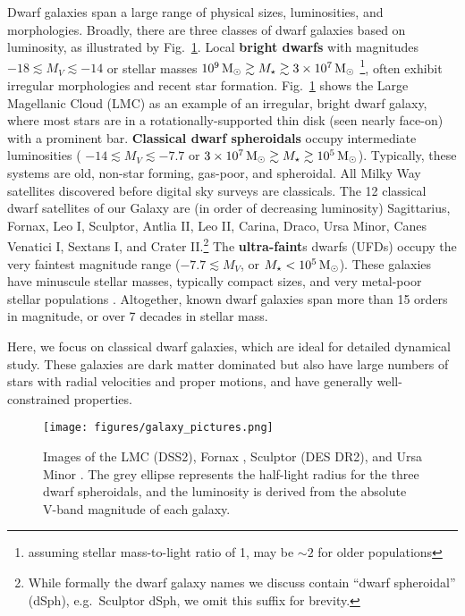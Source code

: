 Dwarf galaxies span a large range of physical sizes, luminosities, and
morphologies. Broadly, there are three classes of dwarf galaxies based
on luminosity, as illustrated by Fig.~\ref{fig:galaxy_images}. Local
\textbf{bright dwarfs} with magnitudes
\(-18 \lesssim M_V \lesssim  -14\) or stellar masses
\(10^9\,{\rm M}_{\odot} \gtrsim M_\star \gtrsim 3\times10^7\,{\rm M}_{\odot}\) \footnote{assuming
  stellar mass-to-light ratio of 1, may be \(\sim 2\) for older
  populations}, often exhibit irregular morphologies and recent star
formation. Fig.~\ref{fig:galaxy_images} shows the Large Magellanic Cloud
(LMC) as an example of an irregular, bright dwarf galaxy, where most
stars are in a rotationally-supported thin disk (seen nearly face-on)
with a prominent bar. \textbf{Classical dwarf spheroidals} occupy
intermediate luminosities ( \(-14 \lesssim M_V  \lesssim -7.7\) or
\(3\times10^7\,{\rm M}_{\odot} \gtrsim M_\star \gtrsim 10^5\,{\rm M}_{\odot}\)). Typically,
these systems are old, non-star forming, gas-poor, and spheroidal. All
Milky Way satellites discovered before digital sky surveys are
classicals. The 12 classical dwarf satellites of our Galaxy are (in
order of decreasing luminosity) Sagittarius, Fornax, Leo I, Sculptor,
Antlia II, Leo II, Carina, Draco, Ursa Minor, Canes Venatici I, Sextans
I, and Crater II.\footnote{While formally the dwarf galaxy names we
  discuss contain ``dwarf spheroidal'' (dSph), e.g.~Sculptor dSph, we
  omit this suffix for brevity.} The \textbf{ultra-faint}s dwarfs (UFDs)
occupy the very faintest magnitude range (\(-7.7 \lesssim M_V\), or
\(M_\star < 10^5\,{\rm M}_{\odot}\)). These galaxies have minuscule stellar masses,
typically compact sizes, and very metal-poor stellar populations
\citep[see review][]{simon2019}. Altogether, known dwarf galaxies span
more than 15 orders in magnitude, or over 7 decades in stellar mass.

Here, we focus on classical dwarf galaxies, which are ideal for detailed
dynamical study. These galaxies are dark matter dominated but also have
large numbers of stars with radial velocities and proper motions, and
have generally well-constrained properties.

\begin{figure}
\centering
\texttt{[image: figures/galaxy\_pictures.png]}
\caption[Dwarf Galaxy Pictures]{Images of the LMC (DSS2), Fornax
\citep[DES DR2,][]{abbott+2021}, Sculptor (DES DR2), and Ursa Minor
\citep[UNWISE,][with \textit{Gaia} point sources
over-plotted]{lang2014, meisner+lang+schlegel2017, meisner+lang+schlegel2017a}.
The grey ellipse represents the half-light radius for the three dwarf
spheroidals, and the luminosity is derived from the absolute V-band
magnitude of each galaxy.}\label{fig:galaxy_images}
\end{figure}

